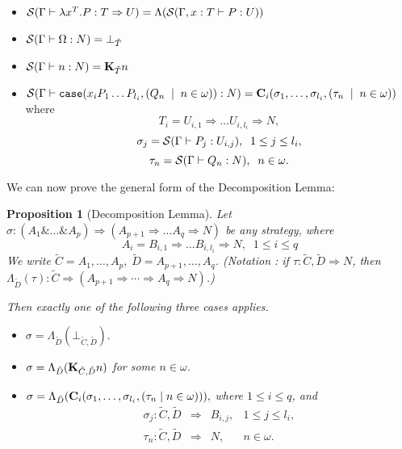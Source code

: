 \documentclass[11pt]{article}
\newtheorem{proposition}[theorem]{Proposition}
\newcommand{\with}{\mbox{$\&$}}
\begin{document}
\begin{itemize}
\item ${\cal S}( \Gamma\vdash\lambda x^T.P:T\Rightarrow
    U)=\Lambda({\cal S}( \Gamma,x:T\vdash P:U))$
\item ${\cal S}( \Gamma\vdash\Omega:N)=\bot_{\tilde{T}}$
\item ${\cal S}( \Gamma\vdash n:N)= {\bf K}_{\tilde{T}}n$
\item ${\cal S}( \Gamma\vdash{\tt case}(x_i P_1\dots P_{l_i},(Q_n\;\mid \;
    n\in\omega)):N)={\bf C}_i(\sigma_1,\dots,\sigma_{l_i},(\tau_n\;\mid \;
  n\in\omega))$
where
$$T_i=U_{i,1}\Rightarrow\dots U_{i,l_i}\Rightarrow N,$$
$$\sigma_j={\cal S}( \Gamma\vdash P_j:U_{i,j}),\;\;1\leq j\leq l_i,$$
$$\tau_n={\cal S}( \Gamma\vdash Q_n:N), \;\; n\in\omega.$$
\end{itemize}
We can now prove the general form of the Decomposition Lemma:
\begin{proposition}[Decomposition Lemma]\label{lem8}
Let $\sigma:(A_1\with\dots\with
A_p)\Rightarrow(A_{p+1}\Rightarrow\dots A_q\Rightarrow N)$ be any
strategy, where
$$A_i=B_{i,1}\Rightarrow\dots B_{i,l_i}\Rightarrow N,\;\; 1\leq i\leq
q$$
We write $\tilde{C}=A_1,\dots,A_p,\; \tilde{D}=A_{p+1},\dots,A_q$.
(Notation : if $\tau:\tilde{C},\tilde{D}\Rightarrow N$, then
$\Lambda_{\tilde{D}}(\tau):\tilde{C}\Rightarrow(A_{p+1}\Rightarrow\cdots
\Rightarrow A_q\Rightarrow N)$.)

Then exactly one of the following three cases applies.
\begin{itemize}
\item[(i)] $\sigma=\Lambda_{\tilde{D}}(\bot_{\tilde{C},\tilde{D}}).$
\item[(ii)] $\sigma=\Lambda_{\tilde{D}}({\bf K}_{\tilde{C},\tilde{D}} n)$
  for some $n\in\omega$.
\item[(iii)]
  $\sigma=\Lambda_{\tilde{D}}({\bf C}_i(\sigma_1,\dots,\sigma_{l_i},
(\tau_n\mid n\in\omega))),$ where $1\leq i\leq q$, and
\[\begin{array}{lllc}
\sigma_j:\tilde{C},\tilde{D} & \Rightarrow & B_{i,j}, & 1\leq j\leq
l_i, \\
\tau_n:\tilde{C},\tilde{D} & \Rightarrow & N, & n\in\omega.
\end{array}\]
\end{itemize}

\end{proposition}
\end{document}
